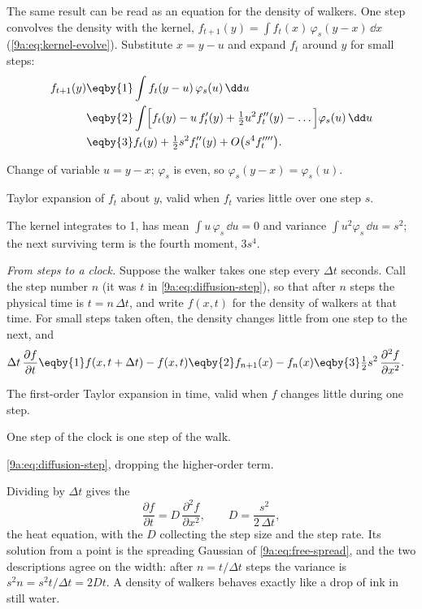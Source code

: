 The same result can be read as an equation for the density of walkers. One step convolves the
density with the kernel, $f_{t+1}(y)=\int f_t(x)\,\varphi_s(y-x)\,\dd x$
(\cref{9a:eq:kernel-evolve}). Substitute $x=y-u$ and expand $f_t$ around $y$ for small steps:
\begin{align}
  f_{t+1}(y)
  &\eqby{1}\int f_t(y-u)\,\varphi_s(u)\,\dd u
  \nonumber\\
  &\eqby{2}\int\Bigl[f_t(y)-u\,f_t'(y)+\tfrac12u^2f_t''(y)-\dots\Bigr]\varphi_s(u)\,\dd u
  \nonumber\\
  &\eqby{3}f_t(y)+\tfrac12s^2f_t''(y)+O\bigl(s^4f_t''''\bigr).
  \label{9a:eq:diffusion-step}
\end{align}
\begin{explain}
  \item Change of variable $u=y-x$; $\varphi_s$ is even, so $\varphi_s(y-x)=\varphi_s(u)$.
  \item Taylor expansion of $f_t$ about $y$, valid when $f_t$ varies little over one step $s$.
  \item The kernel integrates to 1, has mean $\int u\,\varphi_s\,\dd u=0$ and variance
        $\int u^2\varphi_s\,\dd u=s^2$; the next surviving term is the fourth moment, $3s^4$.
\end{explain}
\emph{From steps to a clock.} Suppose the walker takes one step every $\Delta t$ seconds. Call
the step number $n$ (it was $t$ in \eqref{9a:eq:diffusion-step}), so that after $n$ steps the
physical time is $t=n\,\Delta t$, and write $f(x,t)$ for the density of walkers at that time.
For small steps taken often, the density changes little from one step to the next, and
\begin{align*}
  \Delta t\,\frac{\partial f}{\partial t}
  &\eqby{1}f(x,t+\Delta t)-f(x,t)
   \eqby{2}f_{n+1}(x)-f_n(x)
   \eqby{3}\tfrac12s^2\,\frac{\partial^2f}{\partial x^2}.
\end{align*}
\begin{explain}
  \item The first-order Taylor expansion in time, valid when $f$ changes little during one
        step.
  \item One step of the clock is one step of the walk.
  \item \eqref{9a:eq:diffusion-step}, dropping the higher-order term.
\end{explain}
Dividing by $\Delta t$ gives the 
\begin{equation}
  \frac{\partial f}{\partial t}=D\,\frac{\partial^2f}{\partial x^2},
  \qquad D=\frac{s^2}{2\,\Delta t},
  \label{9a:eq:diffusion}
\end{equation}
the heat equation, with the  $D$ collecting the step size and the
step rate. Its solution from a point is the spreading Gaussian of \eqref{9a:eq:free-spread}, and
the two descriptions agree on the width: after $n=t/\Delta t$ steps the variance is
$s^2n=s^2t/\Delta t=2Dt$. A density of
walkers behaves exactly like a drop of ink in still water.

